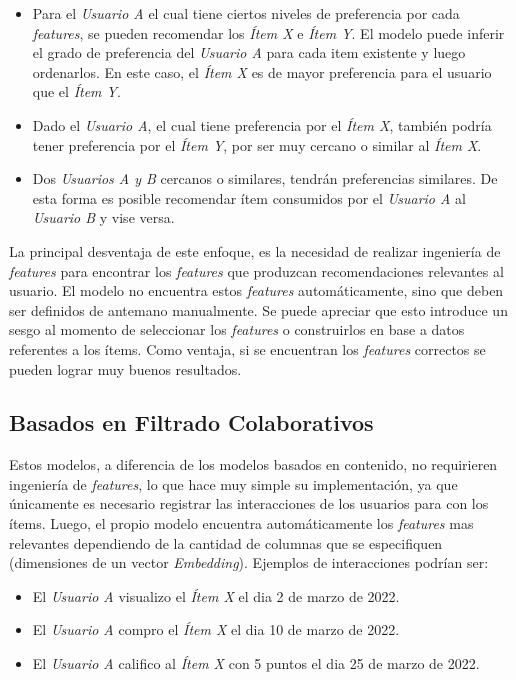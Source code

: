 \documentclass[11pt,a4paper,twoside]{thesis}
\begin{document}
\begin{itemize}
	\item Para el \textit{Usuario A} el cual tiene ciertos niveles de preferencia por
	      cada \textit{features}, se pueden recomendar los \textit{Ítem X} e \textit{Ítem
		      Y}. El modelo puede inferir el grado de preferencia del \textit{Usuario A} para
	      cada item existente y luego ordenarlos. En este caso, el \textit{Ítem X} es de
	      mayor preferencia para el usuario que el \textit{Ítem Y}.

	\item Dado el \textit{Usuario A}, el cual tiene preferencia por el \textit{Ítem X},
	      también podría tener preferencia por el \textit{Ítem Y}, por ser muy cercano o
	      similar al \textit{Ítem X}.

	\item Dos \textit{Usuarios A y B} cercanos o similares, tendrán preferencias
	      similares. De esta forma es posible recomendar ítem consumidos por el
	      \textit{Usuario A} al \textit{Usuario B} y vise versa.
\end{itemize}

La principal desventaja de este enfoque, es la necesidad de realizar ingeniería
de \textit{features} para encontrar los \textit{features} que produzcan
recomendaciones relevantes al usuario. El modelo no encuentra estos
\textit{features} automáticamente, sino que deben ser definidos de antemano
manualmente. Se puede apreciar que esto introduce un sesgo al momento de
seleccionar los \textit{features} o construirlos en base a datos referentes a
los ítems. Como ventaja, si se encuentran los \textit{features} correctos se
pueden lograr muy buenos resultados.

\subsection{Basados en Filtrado Colaborativos}

Estos modelos, a diferencia de los modelos basados en contenido, no requirieren
ingeniería de \textit{features}, lo que hace muy simple su implementación, ya
que únicamente es necesario registrar las interacciones de los usuarios para
con los ítems. Luego, el propio modelo encuentra automáticamente los
\textit{features} mas relevantes dependiendo de la cantidad de columnas que se
especifiquen (dimensiones de un vector \textit{Embedding}). Ejemplos de
interacciones podrían ser:

\begin{itemize}
	\item El \textit{Usuario A} visualizo el \textit{Ítem X} el dia 2 de marzo de 2022.
	\item El \textit{Usuario A} compro el \textit{Ítem X} el dia 10 de marzo de 2022.
	\item El \textit{Usuario A} califico al \textit{Ítem X} con 5 puntos el dia 25 de
	      marzo de 2022.
\end{itemize}
\end{document}
